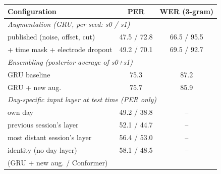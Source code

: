 \begin{tabular}{lcc}
\toprule
Configuration & PER & WER (3-gram) \\
\midrule
\multicolumn{3}{l}{\emph{Augmentation (GRU, per seed: s0 / s1)}} \\
\quad published (noise, offset, cut) & 47.5 / 72.8 & 66.5 / 95.5 \\
\quad + time mask + electrode dropout & 49.2 / 70.1 & 69.5 / 92.7 \\
\multicolumn{3}{l}{\emph{Ensembling (posterior average of s0+s1)}} \\
\quad GRU baseline & 75.3 & 87.2 \\
\quad GRU + new aug. & 75.7 & 85.9 \\
\multicolumn{3}{l}{\emph{Day-specific input layer at test time (PER only)}} \\
\quad own day & 49.2 / 38.8 & -- \\
\quad previous session's layer & 52.1 / 44.7 & -- \\
\quad most distant session's layer & 56.4 / 53.0 & -- \\
\quad identity (no day layer) & 58.1 / 48.5 & -- \\
\quad\footnotesize (GRU + new aug. / Conformer) & & \\
\bottomrule
\end{tabular}